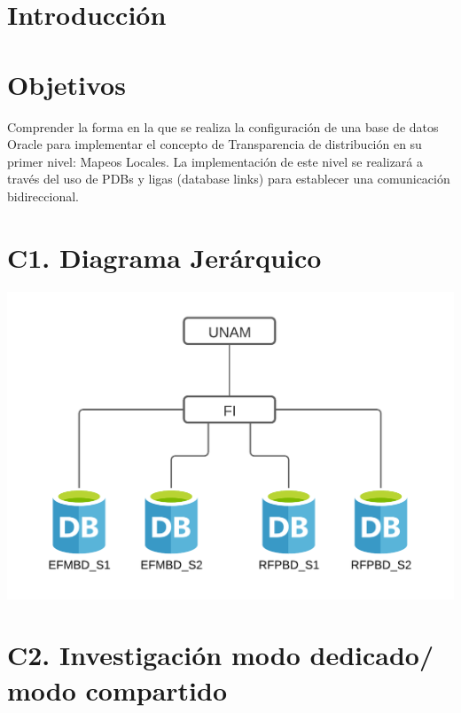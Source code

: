 \documentclass{article}
\begin{document}
\newpage

\section*{Introducción}

\section*{Objetivos}

Comprender la forma en la que se realiza la configuración de una base de datos 
Oracle para implementar el concepto de Transparencia de distribución en su 
primer nivel: Mapeos Locales. La implementación de este nivel se realizará a 
través del uso de PDBs y ligas (database links) para establecer una 
comunicación bidireccional.

\section*{C1. Diagrama Jerárquico }

\includegraphics[width=\linewidth]{diagrama.png}

\section*{C2. Investigación modo dedicado/ modo compartido }
\end{document}
